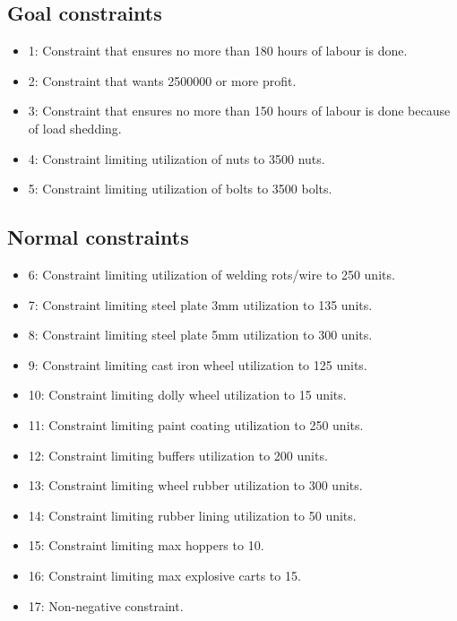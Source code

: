 \documentclass[a4paper,oneside,11pt]{book}
\begin{document}
\subsection{Goal constraints}
\begin{itemize}
    \item 1: Constraint that ensures no more than 180 hours of labour is done.
    \item 2: Constraint that wants 2500000 or more profit.
    \item 3: Constraint that ensures no more than 150 hours of labour is done because of load shedding.
    \item 4: Constraint limiting utilization of nuts to 3500 nuts.
    \item 5: Constraint limiting utilization of bolts to 3500 bolts.
\end{itemize}
\subsection{Normal constraints}
\begin{itemize}
    \item 6: Constraint limiting utilization of welding rots/wire to 250 units.
    \item 7: Constraint limiting steel plate 3mm utilization to 135 units.
    \item 8: Constraint limiting steel plate 5mm utilization to 300 units.
    \item 9: Constraint limiting cast iron wheel utilization to 125 units.
    \item 10: Constraint limiting dolly wheel utilization to 15 units.
    \item 11: Constraint limiting paint coating utilization to 250 units.
    \item 12: Constraint limiting buffers utilization to 200 units.
    \item 13: Constraint limiting wheel rubber utilization to 300 units.
    \item 14: Constraint limiting rubber lining utilization to 50 units.
    \item 15: Constraint limiting max hoppers to 10.
    \item 16: Constraint limiting max explosive carts to 15.
    \item 17: Non-negative constraint.
\end{itemize}
\end{document}
